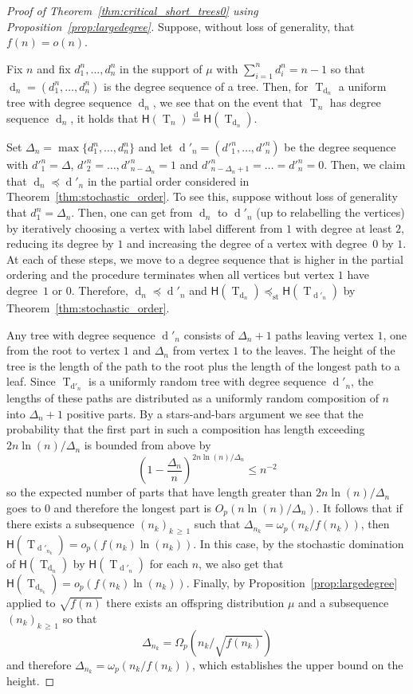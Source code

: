 \documentclass[AHL,Unicode,longabstracts,published]{cedram}
\newcommand{\height}{\mathsf{H}}
\newcommand{\sequence}[1]{\mathrm{#1}}
\DeclareMathOperator{\rtree}{T}
\DeclareMathOperator{\dseq}{d}
\DeclareMathOperator{\st}{st}
\newcommand{\eqdist}{\ensuremath{\stackrel{\mathrm{d}}{=}}}
\begin{document}
\begin{proof}[Proof of Theorem~\ref{thm:critical_short_trees0} {using Proposition~\ref{prop:largedegree}}]
Suppose, without loss of generality, that $f(n)=o(n)$.

Fix $n$ and fix $d^n_1,\dots,d^n_n$ in the support of $\mu$ with $\sum_{i=1}^nd^n_i=n-1$ so that $\dseq_n=(d^n_{1},\dots,d^n_{n})$ is the degree sequence of a tree. Then, for $\rtree_{\dseq_n}$ a uniform tree with degree sequence $\dseq_n$, we see that on the event that $\rtree_n$ has degree sequence $\dseq_n$, it holds that $\height(\rtree_n)\eqdist \height(\rtree_{\dseq_n})$.

Set $\Delta_n=\max\{d^n_1,\dots,d^n_n\}$ and let $\dseq'_n=(d'^n_1,\dots,d'^n_n)$ be the degree sequence with $d'^n_1=\Delta$, $d'^n_2=\dots,d'^n_{n-\Delta_n}=1$ and $d'^n_{n-\Delta_n+1}=\dots=d'^n_n=0$. Then, we claim that $\dseq_n\preceq \dseq'_n$ in the partial order considered in Theorem~\ref{thm:stochastic_order}. To see this, suppose without loss of generality that $d^n_1=\Delta_n$. Then, one can get from $\dseq_n$ to $\dseq'_n$ (up to relabelling the vertices) by iteratively choosing a vertex with label different from $1$ with degree at least $2$, reducing its degree by $1$ and increasing the degree of a vertex with degree~$0$ by $1$. At each of these steps, we move to a degree sequence that is higher in the partial ordering and the procedure terminates when all vertices but vertex $1$ have degree~$1$ or $0$. Therefore, $\dseq_n\preceq \dseq'_n$ and $\height(\rtree_{\dseq_n})\preceq_{\st} \height(\rtree_{\dseq'_n})$ by Theorem~\ref{thm:stochastic_order}.

Any tree with degree sequence $\dseq'_n$ consists of $\Delta_n+1$ paths leaving vertex $1$, one from the root to vertex $1$ and $\Delta_n$ from vertex $1$ to the leaves. The height of the tree is the length of the path to the root plus the length of the longest path to a leaf. Since $\rtree_{\sequence{d'}_n}$ is a uniformly random tree with degree sequence $ \dseq'_n$, the lengths of these paths are distributed as a uniformly random composition of $n$ into $\Delta_n+1$ positive parts. By a stars-and-bars argument we see that the probability that the first part in such a composition has length exceeding $2n\ln(n)/\Delta_n$ is bounded from above by
\[
\left(1-\frac{\Delta_n}{n}\right)^{2n\ln(n)/\Delta_n}\leq n^{-2}
\]
so the expected number of parts that have length greater than $2n\ln(n)/\Delta_n$ goes to $0$ and therefore the longest part is $O_p(n\ln(n)/\Delta_n)$. It follows that if there exists a subsequence $(n_k)_{k\,\geq\,1}$ such that $\Delta_{n_{k}}=\omega_p(n_k/f(n_k))$, then $\height(\rtree_{\dseq'_{n_k}})=o_p(f(n_k)\ln(n_k))$. In this case, by the stochastic domination of $\height(\rtree_{\dseq_n})$ by $\height(\rtree_{\dseq'_n})$ for each $n$, we also get that $\height(\rtree_{\dseq_{n_k}})=o_p(f(n_k)\ln(n_k))$. Finally, by Proposition~\ref{prop:largedegree} applied to $\sqrt{f(n)}$ there exists an offspring distribution $\mu$ and a subsequence $(n_k)_{k\,\geq\,1}$ so that
\[
\Delta_{n_{k}}=\Omega_p\left(n_k/\sqrt{f(n_k)}\right)
\]
and therefore $\Delta_{n_{k}}=\omega_p(n_k/f(n_k))$, which establishes the upper bound on the height.


\end{proof}
\end{document}
